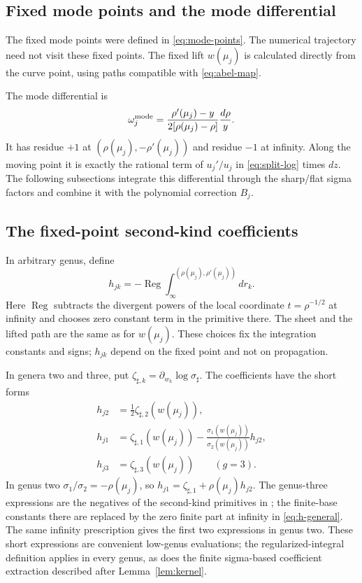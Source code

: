 \documentclass[11pt]{article}
\newcommand{\Reg}{\operatorname{Reg}}
\begin{document}
\subsection{Fixed mode points and the mode differential}

The fixed mode points were defined in \eqref{eq:mode-points}. The numerical trajectory need not visit these fixed points. The fixed lift $w(\mu_j)$ is calculated directly from the curve point, using paths compatible with \eqref{eq:abel-map}.

The mode differential is
\begin{equation}\label{eq:third-kind-diff}
\omega_j^{\rm mode}
=\frac{\rho'(\mu_j)-y}{2[\rho(\mu_j)-\rho]}\frac{d\rho}{y}.
\end{equation}
It has residue $+1$ at $(\rho(\mu_j),-\rho'(\mu_j))$ and residue $-1$ at infinity. Along the moving point it is exactly the rational term of $u_j'/u_j$ in \eqref{eq:split-log} times $dz$. The following subsections integrate this differential through the sharp/flat sigma factors and combine it with the polynomial correction $B_j$.

\subsection{The fixed-point second-kind coefficients}

In arbitrary genus, define
\begin{equation}\label{eq:h-general}
h_{jk}=-\Reg\int_\infty^{(\rho(\mu_j),\rho'(\mu_j))}dr_k.
\end{equation}
Here $\Reg$ subtracts the divergent powers of the local coordinate $t=\rho^{-1/2}$ at infinity and chooses zero constant term in the primitive there. The sheet and the lifted path are the same as for $w(\mu_j)$. These choices fix the integration constants and signs; $h_{jk}$ depend on the fixed point and not on propagation.

In genera two and three, put $\zeta_{\sharp,k}=\partial_{w_k}\log\sigma_\sharp$. The coefficients have the short forms
\begin{equation}\label{eq:h-formulas}
\begin{aligned}
h_{j2}&=\tfrac12\zeta_{\sharp,2}(w(\mu_j)),\\
h_{j1}&=\zeta_{\sharp,1}(w(\mu_j))
-\frac{\sigma_1(w(\mu_j))}{\sigma_2(w(\mu_j))}h_{j2},\\
h_{j3}&=\zeta_{\sharp,3}(w(\mu_j))\qquad (g=3).
\end{aligned}
\end{equation}
In genus two $\sigma_1/\sigma_2=-\rho(\mu_j)$, so $h_{j1}=\zeta_{\sharp,1}+\rho(\mu_j)h_{j2}$. The genus-three expressions are the negatives of the second-kind primitives in \cite[Proposition~III.2, Eq.~III.10]{thirdkind}; the finite-base constants there are replaced by the zero finite part at infinity in \eqref{eq:h-general}. The same infinity prescription gives the first two expressions in genus two. These short expressions are convenient low-genus evaluations; the regularized-integral definition applies in every genus, as does the finite sigma-based coefficient extraction described after Lemma~\ref{lem:kernel}.
\end{document}
